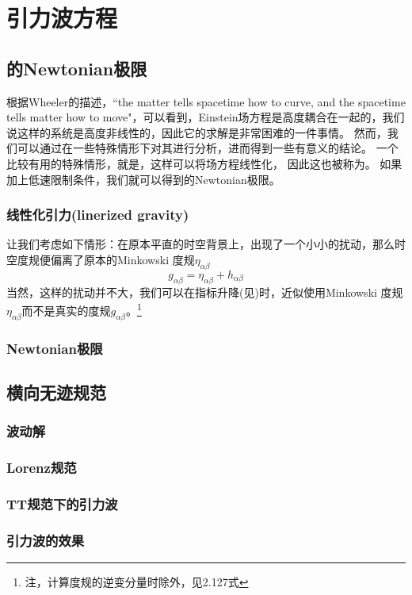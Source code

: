 
\chapter{引力波方程}
\label{chap2}

\section{\GR 的Newtonian极限}
根据Wheeler的描述，``the matter tells spacetime how to curve, and the spacetime tells matter how to move"，可以看到，Einstein场方程是高度耦合在一起的，我们说这样的系统是高度非线性的，因此它的求解是非常困难的一件事情。
然而，我们可以通过在一些特殊情形下对其进行分析，进而得到一些有意义的结论。
一个比较有用的特殊情形，就是{}，这样可以将场方程线性化， 因此这也被称为{}。
如果加上低速限制条件，我们就可以得到\GR 的Newtonian极限。

\subsection{线性化引力(linerized gravity)}
让我们考虑如下情形：在原本平直的时空背景上，出现了一个小小的扰动，那么时空度规便偏离了原本的Minkowski 度规$\eta_{\alpha\beta}$
\begin{equation}\label{eq:LinearMetric} 
  g_{\alpha\beta}=  \eta _{\alpha\beta} + h_{\alpha\beta}
\end{equation}
当然，这样的扰动并不大，我们可以在指标升降(见)时，近似使用Minkowski 度规$\eta _{\alpha\beta}$而不是真实的度规$g_{\alpha\beta}$。\footnote{注，计算度规的逆变分量时除外，见\cite{Creighton2011}2.127式}

\subsection{Newtonian极限}

\section{横向无迹规范}

\subsection{波动解}

\subsection{Lorenz规范}

\subsection{TT规范下的引力波}

\subsection{引力波的效果}
